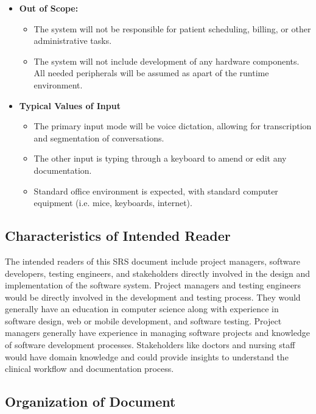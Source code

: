 \documentclass[12pt]{article}
\begin{document}
\begin{itemize}
  \item \textbf{Out of Scope:}
  \begin{itemize}
    \item The system will not be responsible for patient scheduling, billing, or other administrative tasks.
    \item The system will not include development of any hardware components. All needed peripherals will be assumed as apart of the runtime environment.
  \end{itemize}
  \item \textbf{Typical Values of Input}
  \begin{itemize}
    \item The primary input mode will be voice dictation, allowing for transcription and segmentation of conversations.
    \item The other input is typing through a keyboard to amend or edit any documentation.
    \item Standard office environment is expected, with standard computer equipment (i.e. mice, keyboards, internet).
  \end{itemize}
\end{itemize}


\subsection{Characteristics of Intended Reader} \label{sec_IntendedReader} 

The intended readers of this SRS document include project managers, software developers, testing engineers, and stakeholders directly involved in the design and implementation of the software system. Project managers and testing engineers would be directly involved in the development and testing process. They would generally have an education in computer science along with experience in software design, web or mobile development, and software testing. Project managers generally have experience in managing software projects and knowledge of software development processes. Stakeholders like doctors and nursing staff would have domain knowledge and could provide insights to understand the clinical workflow and documentation process. 

\subsection{Organization of Document} \label{sec_OrganizationOfDocument}
\end{document}
